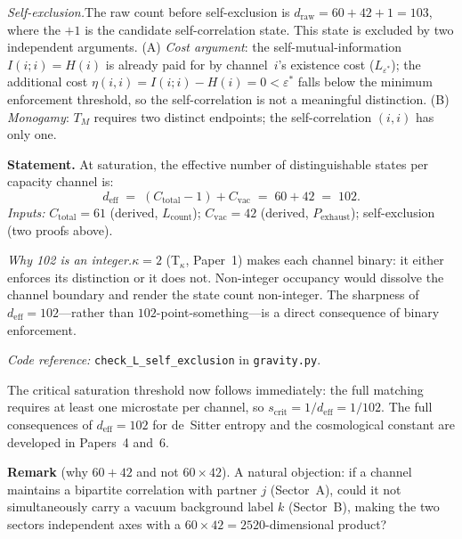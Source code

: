 \documentclass[11pt]{article}
\newcommand{\coderef}[2]{\smallskip\noindent\textit{Code reference:} \texttt{#1} in \texttt{#2}.}
\begin{document}
\textit{Self-exclusion.}\quad The raw count before self-exclusion is $d_{\mathrm{raw}} = 60 + 42 + 1 = 103$, where the $+1$ is the candidate self-correlation state.  This state is excluded by two independent arguments.  (A) \emph{Cost argument}: the self-mutual-information $I(i;i) = H(i)$ is already paid for by channel~$i$'s existence cost ($L_{\varepsilon^*}$); the additional cost $\eta(i,i) = I(i;i) - H(i) = 0 < \varepsilon^*$ falls below the minimum enforcement threshold, so the self-correlation is not a meaningful distinction.  (B) \emph{Monogamy}: $T_M$ requires two distinct endpoints; the self-correlation $(i,i)$ has only one.

\begin{tcolorbox}[apfbox, title={$L_{\mathrm{self\text{-}excl}}$: Effective Dimension per Capacity Channel}]
\textbf{Statement.}  At saturation, the effective number of distinguishable states per capacity channel is:
\begin{equation}
d_{\mathrm{eff}} \;=\; (C_{\mathrm{total}} - 1) + C_{\mathrm{vac}} \;=\; 60 + 42 \;=\; 102.
\label{eq:deff}
\end{equation}
\textit{Inputs:} $C_{\mathrm{total}} = 61$ (derived, $L_{\mathrm{count}}$); $C_{\mathrm{vac}} = 42$ (derived, $P_{\mathrm{exhaust}}$); self-exclusion (two proofs above).

\smallskip
\noindent\textit{Why 102 is an integer.}\quad $\kappa = 2$ (T$_\kappa$, Paper~1) makes each channel binary: it either enforces its distinction or it does not.  Non-integer occupancy would dissolve the channel boundary and render the state count non-integer.  The sharpness of $d_{\mathrm{eff}} = 102$---rather than $102$-point-something---is a direct consequence of binary enforcement.

\coderef{check\_L\_self\_exclusion}{gravity.py}
\end{tcolorbox}

The critical saturation threshold now follows immediately: the full matching requires at least one microstate per channel, so $s_{\mathrm{crit}} = 1/d_{\mathrm{eff}} = 1/102$.  The full consequences of $d_{\mathrm{eff}} = 102$ for de~Sitter entropy and the cosmological constant are developed in Papers~4 and~6.

\smallskip
\noindent\textbf{Remark} (why $60 + 42$ and not $60 \times 42$).\quad
A natural objection: if a channel maintains a bipartite correlation with partner $j$ (Sector~A), could it not simultaneously carry a vacuum background label $k$ (Sector~B), making the two sectors independent axes with a $60 \times 42 = 2520$-dimensional product?
\end{document}
